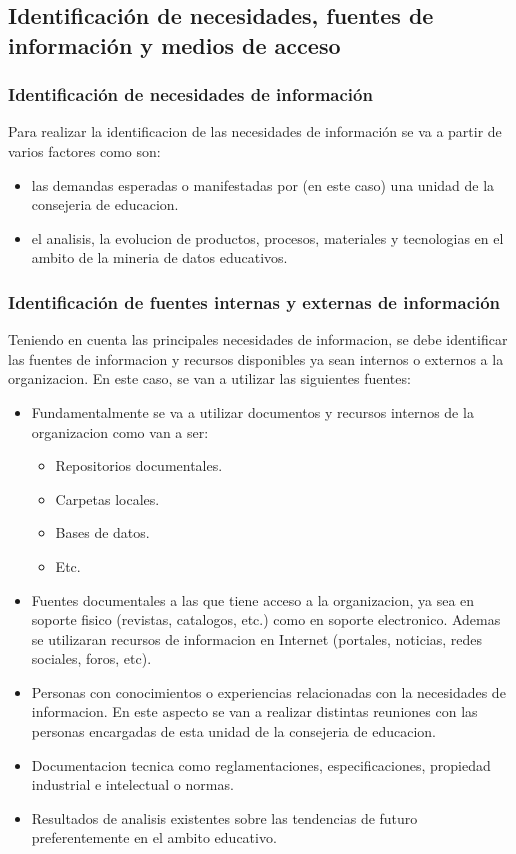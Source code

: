 \documentclass[spanish,12pt, a4paper,twoside]{paper}
\begin{document}
\subsection{Identificación de necesidades, fuentes de información y medios de acceso}
\subsubsection{Identificación de necesidades de información}
Para realizar la identificacion de las necesidades de información se va a partir de varios factores como son:
\begin{itemize}
\item las demandas esperadas o manifestadas por (en este caso) una unidad de la consejeria de educacion.
\item el analisis, la evolucion de productos, procesos, materiales y tecnologias en el ambito de la mineria de datos educativos.
\end{itemize}

\subsubsection{Identificación de fuentes internas y externas de información}
Teniendo en cuenta las principales necesidades de informacion, se debe identificar las fuentes de informacion y recursos disponibles ya sean internos o externos a la organizacion. En este caso, se van a utilizar las siguientes fuentes:
\begin{itemize}
\item Fundamentalmente se va a utilizar documentos y recursos internos de la organizacion como van a ser:
\begin{itemize}
\item Repositorios documentales.
\item Carpetas locales.
\item Bases de datos.
\item Etc.
\end{itemize}
\item Fuentes documentales a las que tiene acceso a la organizacion, ya sea en soporte fisico (revistas, catalogos, etc.) como en soporte electronico. Ademas se utilizaran recursos de informacion en Internet (portales, noticias, redes sociales, foros, etc). 
\item Personas con conocimientos o experiencias relacionadas con la necesidades de informacion. En este aspecto se van a realizar distintas reuniones con las personas encargadas de esta unidad de la consejeria de educacion.
\item Documentacion tecnica como reglamentaciones, especificaciones, propiedad industrial e intelectual o normas.
\item Resultados de analisis existentes sobre las tendencias de futuro preferentemente en el ambito educativo.
\end{itemize}
\end{document}
